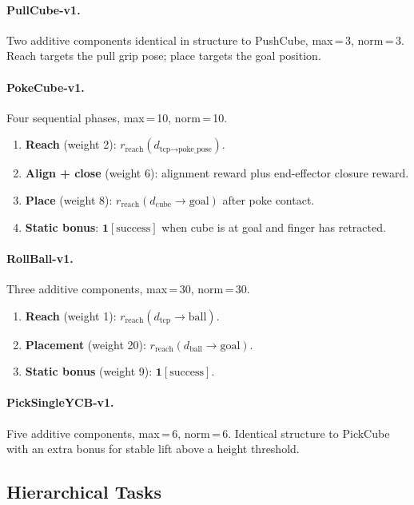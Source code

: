 \documentclass{article}
\begin{document}
\paragraph{PullCube-v1.}
Two additive components identical in structure to PushCube, max\,=\,3, norm\,=\,3.
Reach targets the pull grip pose; place targets the goal position.

\paragraph{PokeCube-v1.}
Four sequential phases, max\,=\,10, norm\,=\,10.
\begin{enumerate}
  \item \textbf{Reach} (weight 2): $r_\text{reach}(d_{\text{tcp}{\to}\text{poke\_pose}})$.
  \item \textbf{Align + close} (weight 6): alignment reward plus end-effector closure reward.
  \item \textbf{Place} (weight 8): $r_\text{reach}(d_\text{cube}{\to}\text{goal})$ after poke contact.
  \item \textbf{Static bonus}: $\mathbf{1}[\text{success}]$ when cube is at goal and finger has retracted.
\end{enumerate}

\paragraph{RollBall-v1.}
Three additive components, max\,=\,30, norm\,=\,30.
\begin{enumerate}
  \item \textbf{Reach} (weight 1): $r_\text{reach}(d_\text{tcp}{\to}\text{ball})$.
  \item \textbf{Placement} (weight 20): $r_\text{reach}(d_\text{ball}{\to}\text{goal})$.
  \item \textbf{Static bonus} (weight 9): $\mathbf{1}[\text{success}]$.
\end{enumerate}

\paragraph{PickSingleYCB-v1.}
Five additive components, max\,=\,6, norm\,=\,6. Identical structure to PickCube with an extra bonus for stable lift above a height threshold.

\subsection*{Hierarchical Tasks}
\end{document}
